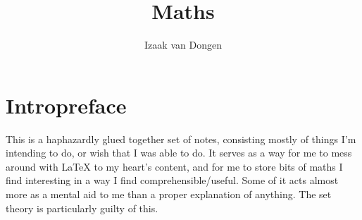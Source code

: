 \documentclass[fleqn,a4paper,11pt]{article}
\title{Maths}
\author{Izaak van Dongen}
\begin{document}
 \maketitle\thispagestyle{empty} %
 \tableofcontents
 \listoftables
 \listoffigures
 \listoflistings
 \listoftheorems

 \section{Intropreface}

 This is a haphazardly glued together set of notes, consisting mostly of things
 I'm intending to do, or wish that I was able to do. It serves as a way for me
 to mess around with \LaTeX{} to my heart's content, and for me to store bits of
 maths I find interesting in a way I find comprehensible/useful. Some of it acts
 almost more as a mental aid to me than a proper explanation of anything. The
 set theory is particularly guilty of this.

 
 
 
 
 
 
 
 
 
 
 
 
 
 
 
 
\nocite{*}



\end{document}

